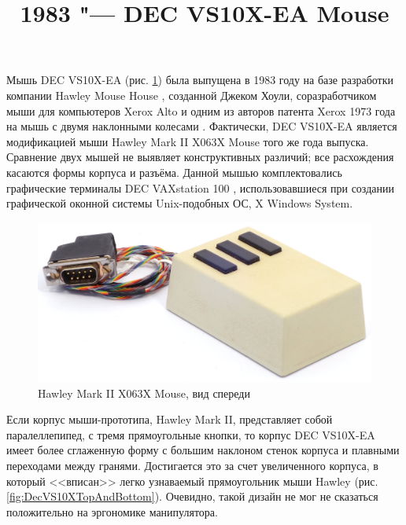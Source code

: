 \documentclass[11pt, a4paper]{article}
\begin{document}
\title{1983 "--- DEC VS10X-EA Mouse}
\date{}
\maketitle

    Мышь DEC VS10X-EA (рис. \ref{fig:DecVS10XPic}) была выпущена в 1983 году на базе разработки компании Hawley Mouse House \cite{hawley,mouses}, созданной Джеком Хоули, соразработчиком мыши для компьютеров Xerox Alto и одним из авторов патента Xerox 1973 года на мышь с двумя наклонными колесами \cite{pat}. Фактически, DEC VS10X-EA является модификацией мыши Hawley Mark II X063X Mouse того же года выпуска. Сравнение двух мышей не выявляет конструктивных различий; все расхождения касаются формы корпуса и разъёма. Данной мышью комплектовались графические терминалы DEC VAXstation 100 \cite{reddit}, использовавшиеся при создании графической оконной системы Unix-подобных ОС, X Windows System.

\begin{figure}[h]
   \centering
    \includegraphics[scale=0.6]{1983_hawley_mark_ii/pic_60.jpg}
    \caption{Hawley Mark II X063X Mouse, вид спереди}
    \label{fig:DecVS10XPic}
\end{figure}

Если корпус мыши-прототипа, Hawley Mark II, представляет собой паралеллепипед, с тремя прямоугольные кнопки, то корпус DEC VS10X-EA имеет более сглаженную форму с большим наклоном стенок корпуса и плавными переходами между гранями. Достигается это за счет увеличенного корпуса, в который <<вписан>> легко узнаваемый прямоугольник мыши Hawley (рис. \ref{fig:DecVS10XTopAndBottom}). Очевидно, такой дизайн не мог не сказаться положительно на эргономике манипулятора.
\end{document}
